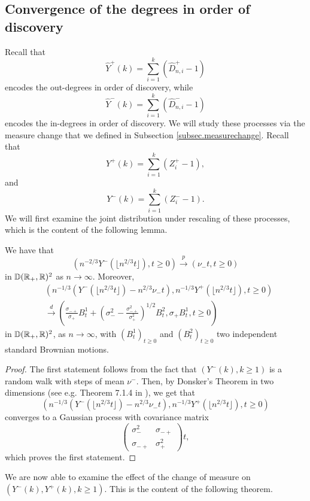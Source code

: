 

\subsection{Convergence of the degrees in order of discovery}
Recall that
$$ \hat{Y}^+(k)=\sum\limits_{i=1}^k (\hat{D}^+_{n,i}-1)$$
encodes the out-degrees in order of discovery, while 
$$ \hat{Y}^-(k)=\sum\limits_{i=1}^k (\hat{D}^-_{n,i}-1)$$
encodes the in-degrees in order of discovery.
 We will study these processes via the measure change that we defined in Subsection \ref{subsec.measurechange}. Recall that 
 $$ {Y}^+(k)=\sum\limits_{i=1}^k (Z^+_i-1),$$ 
 and 
 $$ {Y}^-(k)=\sum\limits_{i=1}^k (Z^-_i-1).$$ 
 We will first examine the joint distribution under rescaling of these processes, which is the content of the following lemma.
\begin{lemma}
\label{lem.jointconvergenceinout}
 We have that $$ \left(n^{-2/3}{Y}^-\left(\lfloor n^{2/3}t\rfloor\right), t\geq 0\right)
 \overset{p}{\to} 
 \left(\nu_-t, t\geq 0 \right)$$
 in ${\mathbb D}({\mathbb R}_+,{\mathbb R})^2$ as $n\to \infty$.  Moreover,
 \begin{align*} &\left(n^{-1/3}\left({Y}^-\left(\lfloor n^{2/3}t\rfloor\right)-n^{2/3}\nu_-t\right),n^{-1/3}Y^+\left(\lfloor n^{2/3}t\rfloor\right), t\geq 0\right)\\
 &\overset{d}{\to} 
 \left(\frac{\sigma_{-+}}{\sigma_+}B_t^1+\left(\sigma_-^2-\frac{\sigma_{-+}^2}{\sigma_+^2}\right)^{1/2}B_t^2   ,\sigma_+ B_t^1, t\geq 0 \right)\end{align*}
 in ${\mathbb D}({\mathbb R}_+,{\mathbb R})^2$, as $n\to \infty$, with $(B^1_t)_{t\geq 0}$ and $(B^2_t)_{t\geq 0}$ two independent standard Brownian motions. 
\end{lemma} 
\begin{proof}
The first statement follows from the fact that $(Y^-(k),k\geq 1)$ is a random walk with steps of mean $\nu^-$. Then, by Donsker's Theorem in two dimensions (see e.g. Theorem 7.1.4 in \cite{Ethier1986}), we get that 
 $$\left(n^{-1/3}\left({Y}^-\left(\lfloor n^{2/3}t\rfloor\right)-n^{2/3}\nu_-t\right),n^{-1/3}Y^+\left(\lfloor n^{2/3}t\rfloor\right), t\geq 0\right)$$
 converges to a Gaussian process with covariance matrix
 $$\begin{pmatrix} \sigma_-^2  & \sigma_{-+} \\ \sigma_{-+}  & \sigma_+^2  \end{pmatrix}t,$$
 which proves the first statement. 
 \end{proof}
 We are now able to examine the effect of the change of measure on $(Y^-(k),Y^+(k),k\geq 1)$. This is the content of the following theorem. 
